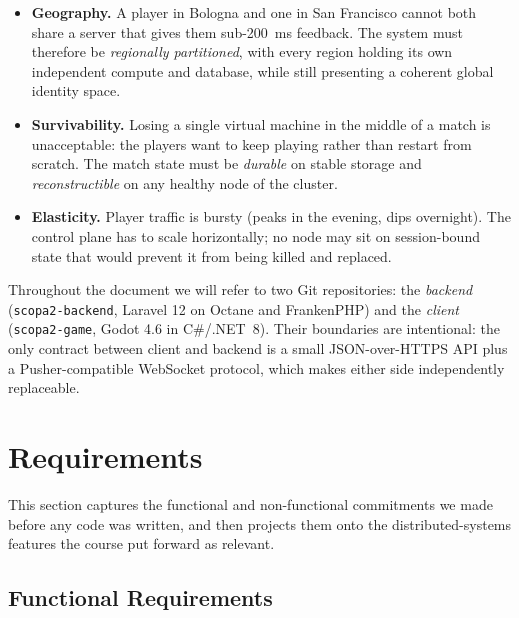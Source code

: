 \documentclass{scrartcl}
\begin{document}
\begin{itemize}[leftmargin=1.4em]
  \item \textbf{Geography.} A player in Bologna and one in San Francisco
  cannot both share a server that gives them sub-200~ms feedback. The
  system must therefore be \emph{regionally partitioned}, with every
  region holding its own independent compute and database, while still
  presenting a coherent global identity space.
  \item \textbf{Survivability.} Losing a single virtual machine in the
  middle of a match is unacceptable: the players want to keep playing
  rather than restart from scratch. The match state must be \emph{durable}
  on stable storage and \emph{reconstructible} on any healthy node of the
  cluster.
  \item \textbf{Elasticity.} Player traffic is bursty (peaks in the
  evening, dips overnight). The control plane has to scale horizontally;
  no node may sit on session-bound state that would prevent it from being
  killed and replaced.
\end{itemize}

Throughout the document we will refer to two Git repositories: the
\emph{backend} (\texttt{scopa2-backend}, Laravel 12 on Octane and
FrankenPHP) and the \emph{client} (\texttt{scopa2-game}, Godot 4.6 in
C\#/.NET~8). Their
boundaries are intentional: the only contract between client and backend
is a small JSON-over-HTTPS API plus a Pusher-compatible WebSocket
protocol, which makes either side independently replaceable.

\section{Requirements}\label{requirements}

This section captures the functional and non-functional commitments we
made before any code was written, and then projects them onto the
distributed-systems features the course put forward as relevant.

\subsection{Functional Requirements}
\end{document}
